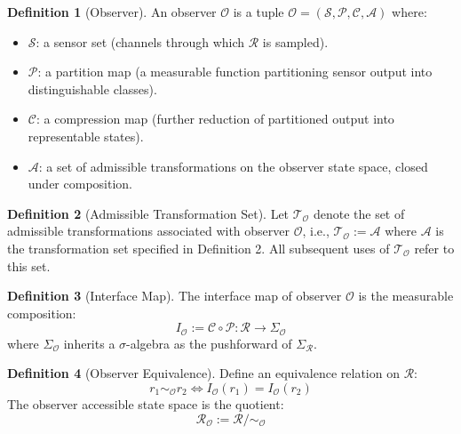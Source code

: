 \documentclass[12pt]{article}
\theoremstyle{definition}
\newtheorem{definition}{Definition}
\begin{document}
\begin{definition}[Observer]
An observer $\mathcal{O}$ is a tuple $\mathcal{O} = (\mathcal{S}, \mathcal{P}, \mathcal{C}, \mathcal{A})$ where:
\begin{itemize}
    \item $\mathcal{S}$: a sensor set (channels through which $\mathcal{R}$ is sampled).
    \item $\mathcal{P}$: a partition map (a measurable function partitioning sensor output into distinguishable classes).
    \item $\mathcal{C}$: a compression map (further reduction of partitioned output into representable states).
    \item $\mathcal{A}$: a set of admissible transformations on the observer state space, closed under composition.
\end{itemize}
\end{definition}

\begin{definition}[Admissible Transformation Set]
Let $\mathcal{T}_{\mathcal{O}}$ denote the set of admissible transformations associated with observer $\mathcal{O}$, i.e., $\mathcal{T}_{\mathcal{O}} := \mathcal{A}$ where $\mathcal{A}$ is the transformation set specified in Definition 2. All subsequent uses of $\mathcal{T}_{\mathcal{O}}$ refer to this set.
\end{definition}

\begin{definition}[Interface Map]
The interface map of observer $\mathcal{O}$ is the measurable composition:
\begin{equation}
I_{\mathcal{O}} := \mathcal{C} \circ \mathcal{P} : \mathcal{R} \to \Sigma_{\mathcal{O}}
\end{equation}
where $\Sigma_{\mathcal{O}}$ inherits a $\sigma$-algebra as the pushforward of $\Sigma_{\mathcal{R}}$.
\end{definition}

\begin{definition}[Observer Equivalence]
Define an equivalence relation on $\mathcal{R}$:
\begin{equation}
r_1 \sim_{\mathcal{O}} r_2 \iff I_{\mathcal{O}}(r_1) = I_{\mathcal{O}}(r_2)
\end{equation}
The observer accessible state space is the quotient:
\begin{equation}
\mathcal{R}_{\mathcal{O}} := \mathcal{R} / {\sim_{\mathcal{O}}}
\end{equation}
\end{definition}
\end{document}

